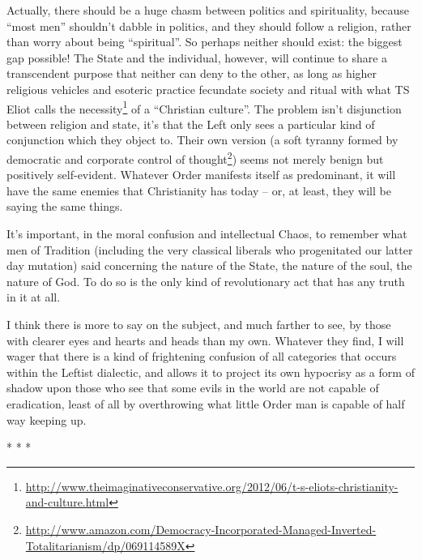 Actually, there should be a huge chasm between politics and spirituality, because ``most men'' shouldn't dabble in politics, and they should follow a religion, rather than worry about being ``spiritual''. So perhaps neither should exist: the biggest gap possible! The State and the individual, however, will continue to share a transcendent purpose that neither can deny to the other, as long as higher religious vehicles and esoteric practice fecundate society and ritual with what TS Eliot calls the necessity\footnote{\url{http://www.theimaginativeconservative.org/2012/06/t-s-eliots-christianity-and-culture.html}} of a ``Christian culture''. The problem isn't disjunction between religion and state, it's that the Left only sees a particular kind of conjunction which they object to. Their own version (a soft tyranny formed by democratic and corporate control of thought\footnote{\url{http://www.amazon.com/Democracy-Incorporated-Managed-Inverted-Totalitarianism/dp/069114589X}}) seems not merely benign but positively self-evident. Whatever Order manifests itself as predominant, it will have the same enemies that Christianity has today -- or, at least, they will be saying the same things.

It's important, in the moral confusion and intellectual Chaos, to remember what men of Tradition (including the very classical liberals who progenitated our latter day mutation) said concerning the nature of the State, the nature of the soul, the nature of God. To do so is the only kind of revolutionary act that has any truth in it at all.

I think there is more to say on the subject, and much farther to see, by those with clearer eyes and hearts and heads than my own. Whatever they find, I will wager that there is a kind of frightening confusion of all categories that occurs within the Leftist dialectic, and allows it to project its own hypocrisy as a form of shadow upon those who see that some evils in the world are not capable of eradication, least of all by overthrowing what little Order man is capable of half way keeping up.



\begin{center}* * *\end{center}


